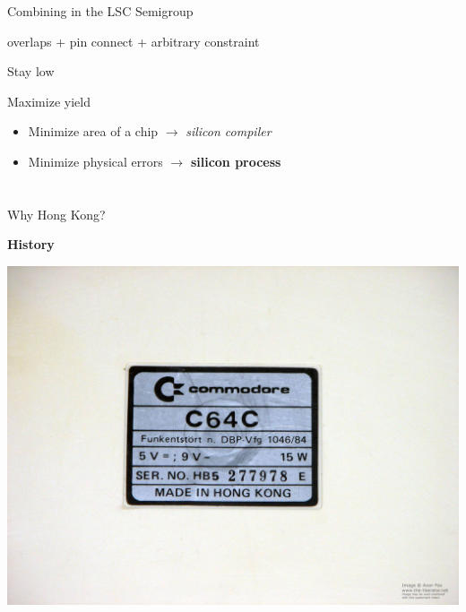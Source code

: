 \documentclass[aspectratio=169]{beamer}
\begin{document}
\begin{frame}{Combining in the LSC Semigroup}
    \begin{center}
        overlaps + pin connect + arbitrary constraint
    \end{center}
\end{frame}

\begin{frame}{Stay low}
\end{frame}

\begin{frame}{Maximize yield}
	\begin{itemize}
        \setlength\itemsep{1em}
		\item Minimize area of a chip $\rightarrow$ \textit{silicon compiler}
		\item Minimize physical errors $\rightarrow$ \textbf{silicon process}
	\end{itemize}
\end{frame}

\section[Process]{}

\begin{frame}{Why Hong Kong?}
	\begin{center}
		 \textbf{History}

		\includegraphics[height=0.7\textheight]{images/15443222_1411927645507464_7594635994572097245_o.jpg}
	\end{center}
\end{frame}
\end{document}
